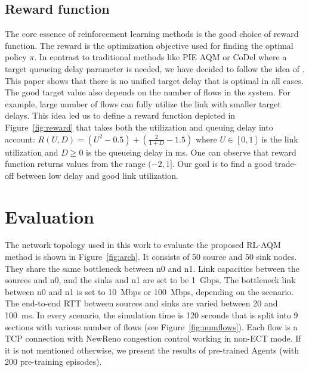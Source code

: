 \documentclass[conference]{IEEEtran}
\begin{document}
\subsection{Reward function}
The core essence of reinforcement learning methods is the good choice of reward function. The reward is the optimization objective used for finding the optimal policy $\pi$. In contrast to traditional methods like PIE AQM or CoDel where a target queueing delay parameter is needed, we have decided to follow the idea of \cite{steeringgsp}. This paper shows that there is no unified target delay that is optimal in all cases. The good target value also depends on the number of flows in the system. For example, large number of flows can fully utilize the link with smaller target delays. This idea led us to define a reward function depicted in Figure~\ref{fig:reward} that takes both the utilization and queuing delay into account: $R(U,D) = (U^2-0.5)+(\frac{2}{1+D}-1.5)$ where $U \in [0,1]$ is the link utilization and $D \ge 0$ is the queueing delay in ms. One can observe that reward function returns values from the range $(-2,1]$. Our goal is to find a good trade-off between low delay and good link utilization.


\section{Evaluation}
The network topology used in this work to evaluate the proposed RL-AQM method is shown in Figure~\ref{fig:arch}. It consists of 50 source and 50 sink nodes. They share the same bottleneck between n0 and n1. Link capacities between the sources and n0, and the sinks and n1 are set to be 1~Gbps. The bottleneck link between n0 and n1 is set to 10~Mbps or 100~Mbps, depending on the scenario. The end-to-end RTT between sources and sinks are varied between 20 and 100~ms.
In every scenario, the simulation time is 120 seconds that is split into 9 sections with various number of flows (see Figure~\ref{fig:numflows}). Each flow is a TCP connection with NewReno congestion control working in non-ECT mode. If it is not mentioned otherwise, we present the results of pre-trained Agents (with 200 pre-training episodes).

\end{document}
